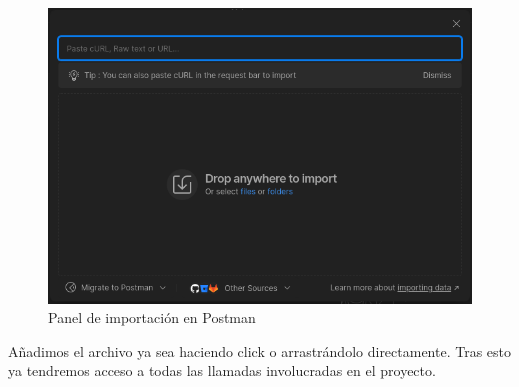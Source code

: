 \documentclass[a4paper, 12pt]{book}
\begin{document}
\begin{figure}[H]
    \centering
    \includegraphics[width=\linewidth]{img/postman_import.png}
    \caption{Panel de importación en Postman}
    \label{fig:postman_import}
\end{figure}

Añadimos el archivo ya sea haciendo click o arrastrándolo directamente. Tras esto ya tendremos acceso a todas las llamadas involucradas en el proyecto.

\cleardoublepage


\end{document}
